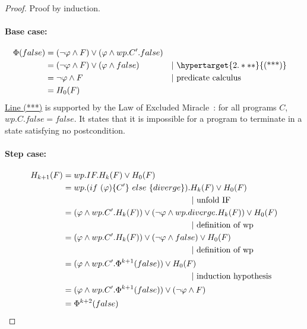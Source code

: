 \begin{proof}
Proof by induction. 
\vspace{-0.25cm}\paragraph{Base case: } 
  \begin{align*} 
    \Phi(false)   & = (\neg\varphi\wedge F)\vee(\varphi\wedge wp.C'.false)  & \\ 
                  & = (\neg\varphi\wedge F)\vee(\varphi\wedge false)         && |\ \hypertarget{2.***}{\text{(***)}}\\
                  & = \neg\varphi\wedge F                                    && |\ \text{predicate calculus} \\
                  & = H_0(F)
  \end{align*}
\hyperlink{2.***}{Line (***)} is supported by the Law of Excluded Miracle~\cite[p.18]{dijkstra76}: for all programs $C$, $wp.C.false = false$. 
It states that it is impossible for a program to terminate in a state satisfying no postcondition. 

\vspace{-0.25cm}\paragraph{Step case: } 
  \begin{align*} 
    H_{k+1}(F)     & = wp.IF.H_{k}(F) \vee H_0(F) \\
                  & = wp.(if\ (\varphi)\{C'\}\ else\ \{diverge\}).H_{k}(F) \vee H_0(F) \\
                  &\hspace{0.45\textwidth} | \ \text{unfold IF} \\
                  & = (\varphi\wedge wp.C'.H_{k}(F))\vee(\neg\varphi\wedge wp.diverge.H_{k}(F)) \vee H_0(F) \\ 
                  &\hspace{0.45\textwidth} | \ \text{definition of wp} \\
                  & = (\varphi\wedge wp.C'.H_{k}(F))\vee(\neg\varphi\wedge false) \vee H_0(F) \\
                  &\hspace{0.45\textwidth} | \ \text{definition of wp} \\
                  & = (\varphi\wedge wp.C'.\Phi^{k+1}(false)) \vee H_0(F)  \\
                  &\hspace{0.45\textwidth} | \ \text{induction hypothesis} \\
                  & = (\varphi\wedge wp.C'.\Phi^{k+1}(false)) \vee (\neg\varphi\wedge F)  \\
                  & = \Phi^{k+2}(false)  \\
  \end{align*}
\end{proof}
